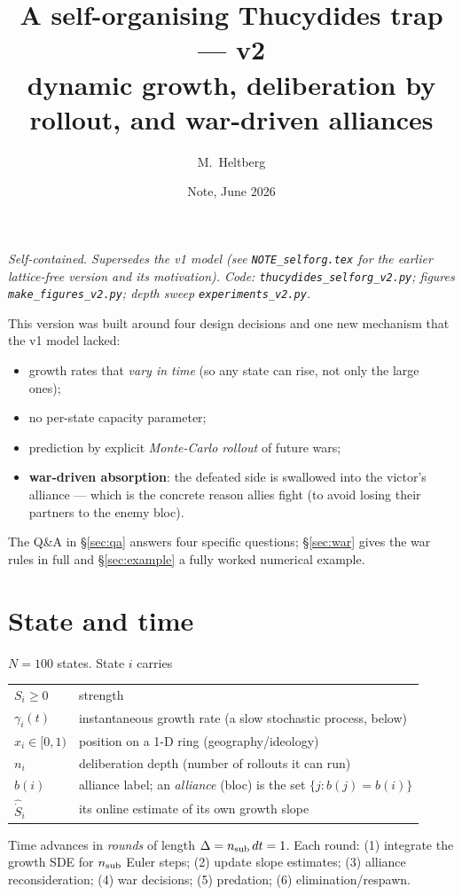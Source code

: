 \documentclass[11pt]{article}
\title{\textbf{A self-organising Thucydides trap --- v2}\\[2pt]
\large dynamic growth, deliberation by rollout, and war-driven alliances}
\author{M.\ Heltberg}
\date{Note, June 2026}
\begin{document}
\maketitle

\noindent\emph{Self-contained. Supersedes the v1 model (see
\texttt{NOTE\_selforg.tex} for the earlier lattice-free version and its
motivation). Code: \texttt{thucydides\_selforg\_v2.py}; figures
\texttt{make\_figures\_v2.py}; depth sweep \texttt{experiments\_v2.py}.}

\bigskip
\noindent This version was built around four design decisions and one new
mechanism that the v1 model lacked:
\begin{itemize}\itemsep1pt
\item growth rates that \emph{vary in time} (so any state can rise, not only the
  large ones);
\item no per-state capacity parameter;
\item prediction by explicit \emph{Monte-Carlo rollout} of future wars;
\item \textbf{war-driven absorption}: the defeated side is swallowed into the
  victor's alliance --- which is the concrete reason allies fight (to avoid
  losing their partners to the enemy bloc).
\end{itemize}
The Q\&A in \S\ref{sec:qa} answers four specific questions; \S\ref{sec:war}
gives the war rules in full and \S\ref{sec:example} a fully worked numerical
example.

\section{State and time}

$N=100$ states. State $i$ carries
\begin{center}
\begin{tabular}{ll}
$S_i\ge0$ & strength \\
$\gamma_i(t)$ & instantaneous growth rate (a slow stochastic process, below) \\
$x_i\in[0,1)$ & position on a 1-D ring (geography/ideology) \\
$n_i$ & deliberation depth (number of rollouts it can run) \\
$b(i)$ & alliance label; an \emph{alliance} (bloc) is the set $\{j:b(j)=b(i)\}$ \\
$\widehat{\dot S}_i$ & its online estimate of its own growth slope \\
\end{tabular}
\end{center}
Time advances in \emph{rounds} of length $\Delta=n_{\rm sub}\,dt=1$. Each round:
(1) integrate the growth SDE for $n_{\rm sub}$ Euler steps; (2) update slope
estimates; (3) alliance reconsideration; (4) war decisions; (5) predation; (6)
elimination/respawn.
\end{document}
